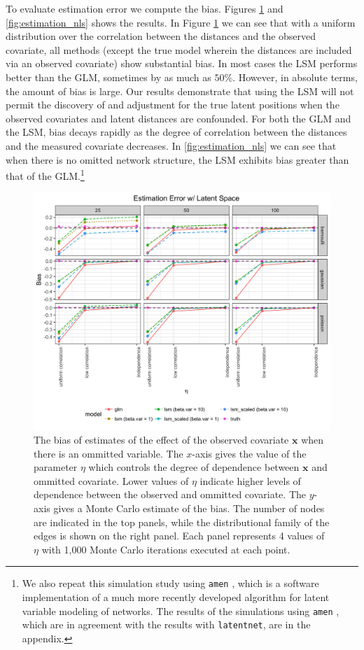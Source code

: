 \documentclass[11pt]{article}
\begin{document}
To evaluate estimation error we compute the bias. Figures
\ref{fig:estimation_ls} and \ref{fig:estimation_nls} shows the
results. In Figure \ref{fig:estimation_ls} we can see that with a
uniform distribution over the correlation between the distances and
the observed covariate, all methods (except the true model wherein the
distances are included via an observed covariate) show substantial
bias. In most cases the LSM performs better than the GLM, sometimes by
as much as $50\%$. However, in absolute terms, the amount of bias is
large. Our results demonstrate that using the LSM will not permit the
discovery of and adjustment for the true latent positions when the
observed covariates and latent distances are confounded.  For both the
GLM and the LSM, bias decays rapidly as the degree of correlation
between the distances and the measured covariate decreases. In
\ref{fig:estimation_nls} we can see that when there is no omitted
network structure, the LSM exhibits bias greater than that of the GLM.\footnote{ We also repeat this simulation study using \texttt{amen}
\citep{hoff2015dyadic, minhas2016inferential,amen},  which is a software implementation of a much more recently developed algorithm for latent variable modeling of networks. The results of the simulations using \texttt{amen} , which are in agreement with the results with \texttt{latentnet}, are in the appendix.}


\begin{figure}
\includegraphics[width=\textwidth]{figures/estimation_ls.png}
\caption{The bias of estimates of the effect of the observed covariate $\mathbf{x}$ when there is an ommitted variable. The $x$-axis gives the value of the parameter $\eta$ which controls the degree of dependence between $\mathbf{x}$ and ommitted covariate. Lower values of $\eta$ indicate higher levels of dependence between the observed and ommitted covariate. The $y$-axis gives a Monte Carlo estimate of the bias. The number of nodes are indicated in the top panels, while the distributional family of the edges is shown on the right panel. Each panel represents 4 values of $\eta$ with 1,000 Monte Carlo iterations executed at each point.
\label{fig:estimation_ls}}
\end{figure}
\end{document}
